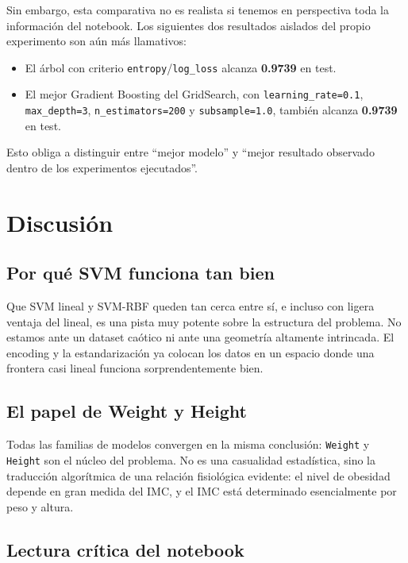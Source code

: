 \documentclass[11pt,a4paper]{article}
\begin{document}
Sin embargo, esta comparativa no es realista si tenemos en perspectiva toda la información del notebook. Los siguientes dos resultados aislados del propio experimento son aún más llamativos:
\begin{itemize}
    \item El árbol con criterio \texttt{entropy}/\texttt{log\_loss} alcanza \textbf{0.9739} en test.
    \item El mejor Gradient Boosting del GridSearch, con \texttt{learning\_rate=0.1}, \texttt{max\_depth=3}, \texttt{n\_estimators=200} y \texttt{subsample=1.0}, también alcanza \textbf{0.9739} en test.
\end{itemize}

Esto obliga a distinguir entre ``mejor modelo'' y ``mejor resultado observado dentro de los experimentos ejecutados''.

\section{Discusión}

\subsection{Por qué SVM funciona tan bien}

Que SVM lineal y SVM-RBF queden tan cerca entre sí, e incluso con ligera ventaja del lineal, es una pista muy potente sobre la estructura del problema. No estamos ante un dataset caótico ni ante una geometría altamente intrincada. El encoding y la estandarización ya colocan los datos en un espacio donde una frontera casi lineal funciona sorprendentemente bien.

\subsection{El papel de Weight y Height}

Todas las familias de modelos convergen en la misma conclusión: \texttt{Weight} y \texttt{Height} son el núcleo del problema. No es una casualidad estadística, sino la traducción algorítmica de una relación fisiológica evidente: el nivel de obesidad depende en gran medida del IMC, y el IMC está determinado esencialmente por peso y altura.

\subsection{Lectura crítica del notebook}
\end{document}
